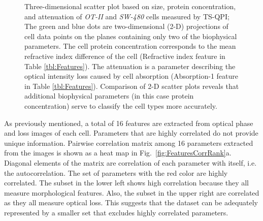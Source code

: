 \documentclass[aps,pra,reprint,longbibliography,superscriptaddress]{revtex4-1}
\begin{document}
\begin{figure*}
\caption{\label{fig:OTSWScatter} Three-dimensional scatter plot based on size, protein concentration, and attenuation of \textit{OT-II} and \textit{SW-480} cells measured by TS-QPI; The green and blue dots are two-dimensional (2-D) projections of cell data points on the planes containing only two of the biophysical parameters. The cell protein concentration corresponds to the mean refractive index difference of the cell (Refractive index feature in Table \ref{tbl:Features}). The attenuation is a parameter describing the optical intensity loss caused by cell absorption (Absorption-1 feature in Table \ref{tbl:Features}). Comparison of 2-D scatter plots reveals that additional biophysical parameters (in this case protein concentration) serve to classify the cell types more accurately.}
\end{figure*}

As previously mentioned, a total of 16 features are extracted from optical phase and loss images of each cell. Parameters that are highly correlated do not provide unique information. Pairwise correlation matrix among 16 parameters extracted from the images is shown as a heat map in Fig.~\ref{fig:FeaturesCorrRank}a. Diagonal elements of the matrix are correlation of each parameter with itself, i.e. the autocorrelation. The set of parameters with the red color are highly correlated. The subset in the lower left shows high correlation because they all measure morphological features. Also, the subset in the upper right are correlated as they all measure optical loss. This suggests that the dataset can be adequately represented by a smaller set that excludes highly correlated parameters.
\end{document}

